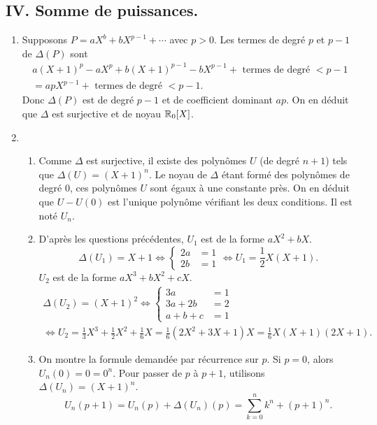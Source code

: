 \subsection*{IV. Somme de puissances.}
\begin{enumerate}
 \item Supposons $P = aX^b + bX^{p-1} + \cdots$ avec $p>0$. Les termes de degré $p$ et $p-1$ de $\Delta(P)$ sont
\begin{multline*}
 a(X+1)^p - aX^p + b(X+1)^{p-1} - bX^{p-1} + \text{ termes de degré } < p-1 \\
 = apX^{p-1} + \text{ termes de degré } < p-1 .
\end{multline*}
Donc $\Delta(P)$ est de degré $p-1$ et de coefficient dominant $ap$. On en déduit que $\Delta$ est surjective et de noyau $\mathbb{R}_0[X]$.

 \item
 \begin{enumerate}
  \item Comme $\Delta$ est surjective, il existe des polynômes $U$ (de degré $n+1$) tels que $\Delta(U) = (X+1)^n$. Le noyau de $\Delta$ étant formé des polynômes de degré $0$, ces polynômes $U$ sont égaux à une constante près. On en déduit que $U-U(0)$ est l'unique polynôme vérifiant les deux conditions. Il est noté $U_n$. 
  
  \item D'après les questions précédentes, $U_1$ est de la forme $aX^2 + b X$.
\[
 \Delta(U_1) = X +1 \Leftrightarrow 
 \left\lbrace 
 \begin{aligned}
  2a &= 1 \\ 2b &= 1
 \end{aligned}
 \right.
 \Leftrightarrow U_1 = \frac{1}{2}X(X+1).
\]
$U_2$ est de la forme $aX^3 + bX^2 + cX$.
\begin{multline*}
 \Delta(U_2) = (X +1)^2 \Leftrightarrow 
 \left\lbrace 
 \begin{aligned}
  3a &= 1 \\ 3a + 2b &= 2 \\ a + b + c &= 1
 \end{aligned}
 \right.\\
 \Leftrightarrow U_2 = \frac{1}{3}X^3 + \frac{1}{2}X^2 + \frac{1}{6}X = \frac{1}{6}(2X^2 + 3X + 1)X
 = \frac{1}{6}X(X+1)(2X+1).
\end{multline*}

  \item On montre la formule demandée par récurrence sur $p$.\newline 
Si $p=0$, alors $U_n(0) = 0 = 0^n$. 
Pour passer de $p$ à $p+1$, utilisons $\Delta(U_{n}) = (X+1)^{n}$.
\[
 U_{n}(p+1) = U_{n}(p) + \Delta(U_{n})(p) = \sum_{k=0}^{n}k^{n} + (p+1)^{n}.
\]


\end{enumerate}
\end{enumerate}

